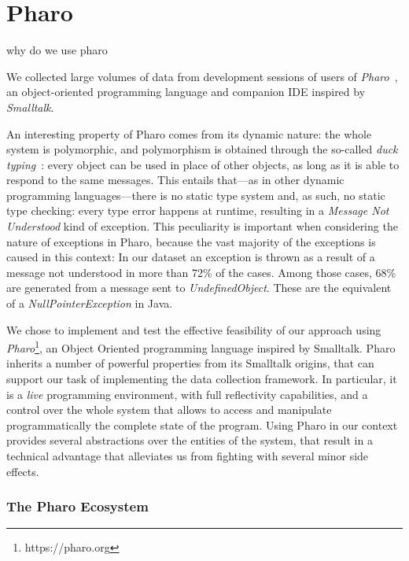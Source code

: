 
\chapter{Pharo}\label{ch:pharo}
why do we use pharo



We collected large volumes of data from development sessions of users of \textit{Pharo}~\cite{black2009}, an object-oriented programming language  and companion IDE inspired by \textit{Smalltalk}.



An interesting property of Pharo comes from its dynamic nature: the whole system is polymorphic, and polymorphism is obtained through the so-called \emph{duck typing}~\cite{Chugh2012}: every object can be used in place of other objects, as long as it is able to respond to the same messages.
This entails that---as in other dynamic programming languages---there is no static type system and, as such, no static type checking: every type error happens at runtime, resulting in a \emph{Message Not Understood} kind of exception.
This peculiarity is important when considering the nature of exceptions in Pharo, because the vast majority of the exceptions is caused in this context: In our dataset an exception is thrown as a result of a message not understood in more than 72\% of the cases.
Among those cases, 68\% are generated from a message sent to \emph{UndefinedObject}.
These are the equivalent of a \emph{NullPointerException} in Java.



We chose to implement and test the effective feasibility of our approach using \emph{Pharo}\footnote{https://pharo.org}, an Object Oriented programming language inspired by Smalltalk.
Pharo inherits a number of powerful properties from its Smalltalk origins, that can support our task of implementing the data collection framework.
In particular, it is a \emph{live} programming environment, with full reflectivity capabilities, and a control over the whole system that allows to access and manipulate programmatically the complete state of the program.
Using Pharo in our context provides several abstractions over the entities of the system, that result in a technical advantage that alleviates us from fighting with several minor side effects.




\subsection{The Pharo Ecosystem}%


